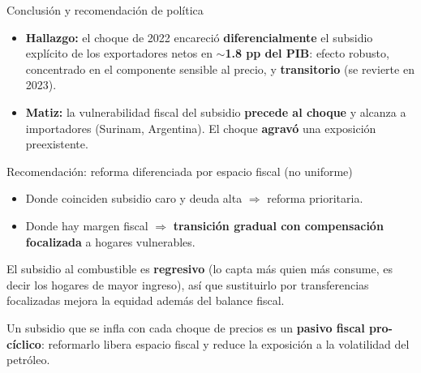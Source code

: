 \documentclass[aspectratio=169,10pt]{beamer}
\newcommand{\key}[1]{{\bfseries\color{AcentoRojo}#1}}
\begin{document}
\begin{frame}{Conclusión y recomendación de política}
  \begin{itemize}
    \item \textbf{Hallazgo:} el choque de 2022 encareció \textbf{diferencialmente} el subsidio
          explícito de los exportadores netos en \key{$\sim$1.8 pp del PIB}: efecto robusto,
          concentrado en el componente sensible al precio, y \textbf{transitorio} (se revierte en 2023).
    \item \textbf{Matiz:} la vulnerabilidad fiscal del subsidio \textbf{precede al choque} y alcanza
          a importadores (Surinam, Argentina). El choque \textbf{agravó} una exposición preexistente.
  \end{itemize}

  \begin{block}{Recomendación: reforma diferenciada por espacio fiscal (no uniforme)}
    \begin{itemize}
      \item Donde coinciden subsidio caro y deuda alta $\Rightarrow$ \alert{reforma prioritaria}.
      \item Donde hay margen fiscal $\Rightarrow$ \textbf{transición gradual con compensación
            focalizada} a hogares vulnerables.
    \end{itemize}
    \vspace{0.2em}
    {\footnotesize El subsidio al combustible es \textbf{regresivo} (lo capta más quien más
    consume, es decir los hogares de mayor ingreso), así que sustituirlo por transferencias
    focalizadas mejora la equidad además del balance fiscal.}
  \end{block}

  \begin{center}\color{Carbon}\small
  Un subsidio que se infla con cada choque de precios es un \textbf{pasivo fiscal pro-cíclico}:
  reformarlo libera espacio fiscal y reduce la exposición a la volatilidad del petróleo.
  \end{center}

\end{frame}
\end{document}
